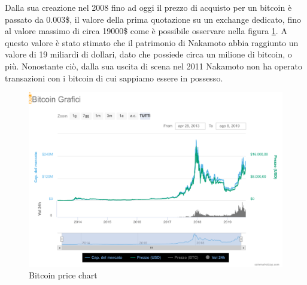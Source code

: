 Dalla sua creazione nel 2008 fino ad oggi il prezzo di acquisto per un bitcoin è passato da  0.003\$, il valore della prima quotazione su un exchange dedicato, fino al valore massimo di circa 19000\$ come è possibile osservare nella figura \ref{fig:chartbitcoin}. A questo valore è stato stimato che il patrimonio di Nakamoto abbia raggiunto un valore di 19 miliardi di dollari, dato che possiede circa un milione di bitcoin, o più. Nonostante ciò, dalla sua uscita di scena nel 2011 Nakamoto non ha operato transazioni con i bitcoin di cui sappiamo essere in possesso. 
\begin{figure}[H]
  \includegraphics[width=\linewidth]{chartbitcoin.png}
  \caption{Bitcoin price chart}
  \label{fig:chartbitcoin}
\end{figure}

